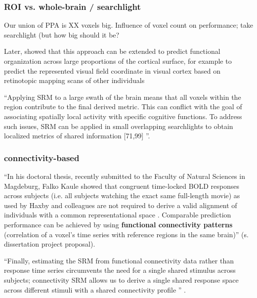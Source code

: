 \subsubsection{ROI vs. whole-brain / searchlight}
%
Our union of PPA is XX voxels big.
%
Influence of voxel count on performance; take searchlight (but how big should it
be?

Later, \citet{guntupalli2016model} showed that this approach can be extended to
predict functional organization across large proportions of the cortical
surface, for example to predict the represented visual field coordinate in
visual cortex based on retinotopic mapping scans of other individuals

``Applying SRM to a large swath of the brain means that all voxels within the
region contribute to the final derived metric. This can conflict with the goal
of associating spatially local activity with specific cognitive functions. To
address such issues, SRM can be applied in small overlapping searchlights to
obtain localized metrics of shared information [71,99]
\citep{cohen2017computational}''.


\subsubsection{connectivity-based}



``In his doctoral thesis, recently submitted to the Faculty of Natural Sciences
in Magdeburg, Falko Kaule showed that congruent time-locked BOLD responses
across subjects (i.e. all subjects watching the exact same full-length movie) as
used by Haxby and colleagues are not required to derive a valid alignment of
individuals with a common representational space \citep{kaule2017examination}.
%
Comparable prediction performance can be achieved by using \textbf{functional
connectivity patterns} (correlation of a voxel's time series with reference
regions in the same brain)'' (s. dissertation project proposal).


``Finally, estimating the SRM from functional connectivity
data rather than response time series circumvents the need for a single shared
stimulus across subjects; connectivity SRM allows us to derive a single shared
response space across different stimuli with a shared connectivity profile
\citep{nastase2019leveraging}'' \citep{kumar2020brainiak}.




